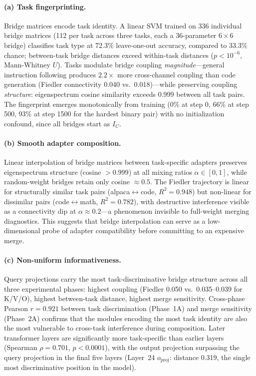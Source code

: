 \paragraph{(a) Task fingerprinting.}
Bridge matrices encode task identity.
A linear SVM trained on 336 individual bridge matrices (112 per task
across three tasks, each a 36-parameter $6 \times 6$ bridge)
classifies task type at 72.3\% leave-one-out accuracy, compared to
33.3\% chance; between-task bridge distances exceed within-task
distances ($p < 10^{-6}$, Mann-Whitney $U$).
Tasks modulate bridge coupling \emph{magnitude}---general instruction
following produces $2.2\times$ more cross-channel coupling than code
generation (Fiedler connectivity 0.040 vs.\ 0.018)---while preserving
coupling \emph{structure}: eigenspectrum cosine similarity exceeds
0.999 between all task pairs.
The fingerprint emerges monotonically from training
(0\% at step 0, 66\% at step 500, 93\% at step 1500 for the hardest
binary pair) with no initialization confound, since all bridges start
as $I_C$.

\paragraph{(b) Smooth adapter composition.}
Linear interpolation of bridge matrices between task-specific adapters
preserves eigenspectrum structure (cosine $> 0.999$) at all mixing
ratios $\alpha \in [0, 1]$, while random-weight bridges retain only
cosine $\approx 0.5$.
The Fiedler trajectory is linear for structurally similar task pairs
(alpaca$\leftrightarrow$code, $R^2 = 0.948$) but non-linear for
dissimilar pairs (code$\leftrightarrow$math, $R^2 = 0.782$), with
destructive interference visible as a connectivity dip at $\alpha
\approx 0.2$---a phenomenon invisible to full-weight merging diagnostics.
This suggests that bridge interpolation can serve as a low-dimensional
probe of adapter compatibility before committing to an expensive merge.

\paragraph{(c) Non-uniform informativeness.}
Query projections carry the most task-discriminative bridge structure
across all three experimental phases: highest coupling (Fiedler 0.050
vs.\ 0.035--0.039 for K/V/O), highest between-task distance, highest
merge sensitivity.
Cross-phase Pearson $r = 0.921$ between task discrimination
(Phase~1A) and merge sensitivity (Phase~2A) confirms that the modules
encoding the most task identity are also the most vulnerable to
cross-task interference during composition.
Later transformer layers are significantly more task-specific than
earlier layers (Spearman $\rho = 0.701$, $p < 0.0001$), with the
output projection surpassing the query projection in the final five
layers (Layer~24 $o_\text{proj}$: distance 0.319, the single most
discriminative position in the model).

